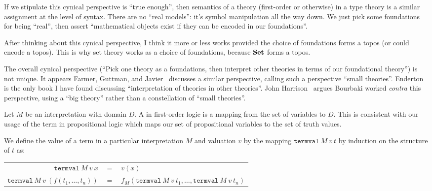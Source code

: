 \begin{node}[Semantics]
\begin{definition}
\begin{node}
\begin{node}
If we stipulate this cynical perspective is ``true enough'', then
semantics of a theory (first-order or otherwise) in a type theory is a
similar assignment at the level of syntax. There are no ``real models'':
it's symbol manipulation all the way down. We just pick some foundations
for being ``real'', then assert ``mathematical objects exist if they can
be encoded in our foundations''.
\end{node}
\begin{node}\label{fol-000I}%
After thinking about this cynical perspective, I think it more or less
works provided the choice of foundations forms a topos (or could encode
a topos). This is why set theory works as a choice of foundations,
because $\mathbf{Set}$ forms a topos.

The overall cynical perspective (``Pick one theory as a foundations,
then interpret other theories in terms of our foundational theory'') is
not unique. It appears Farmer, Guttman, and
Javier~\cite{farmer1992little} discusses a similar perspective, calling
such a perspective ``small
theories''. Enderton~\cite[\S2.7]{enderton2001mathematical} is the only book I
have found discussing ``interpretation of theories in other theories''. John
Harrison~\cite[\S1.4]{harrison1996formalized} argues Bourbaki worked
\emph{contra} this perspective, using a ``big theory'' rather than a
constellation of ``small theories''.
\end{node}
\end{node}
\end{definition}

\begin{definition}\label{fol-0007}%
Let $M$ be an interpretation with domain $D$. A  in
first-order logic is a mapping from the set of variables to $D$.
This is consistent with our usage of the term in propositional logic
 which maps our set of propositional variables to the
set of truth values.
\end{definition}

\begin{definition}\label{fol-0008}%
We define the value of a term in a particular interpretation $M$ and
valuation $v$ by the mapping $\mathtt{termval}~M~v~t$ by induction on
the structure of $t$ as:
\begin{center}
\begin{tabular}{rcl}
$\mathtt{termval}~M~v~x$ & $=$ & $v(x)$\\
$\mathtt{termval}~M~v~(f(t_{1},\dots,t_{n}))$ & $=$ & $f_{M}(\mathtt{termval}~M~v~t_{1},\dots,\mathtt{termval}~M~v~t_{n})$\\
\end{tabular}
\end{center}
\end{definition}


\end{node}
